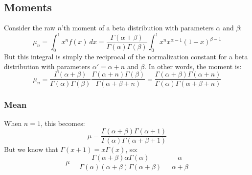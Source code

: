 \documentclass[12pt, a4paper]{article}
\begin{document}

\subsection{Moments}
Consider the raw $n$'th moment of a beta distribution with parameters $\alpha$ and $\beta$:
\begin{equation}
\mu_n=\int_0^1 x^n f(x)\ dx=\frac{\Gamma(\alpha+\beta)}{\Gamma(\alpha)\Gamma(\beta)}\int_0^1 x^n x^{\alpha-1}(1-x)^{\beta-1}
\end{equation}
But this integral is simply the reciprocal of the normalization constant for a beta distribution with parameters $\alpha'=\alpha+n$ and $\beta$. In other words, the moment is:
\begin{equation}
\mu_n=\frac{\Gamma(\alpha+\beta)}{\Gamma(\alpha)\Gamma(\beta)}\frac{\Gamma(\alpha+n)\Gamma(\beta)}{\Gamma(\alpha+\beta+n)}=\frac{\Gamma(\alpha+\beta)\Gamma(\alpha+n)}{\Gamma(\alpha)\Gamma(\alpha+\beta+n)}
\end{equation}

\subsubsection{Mean}
When $n=1$, this becomes:
\begin{equation}
\mu=\frac{\Gamma(\alpha+\beta)\Gamma(\alpha+1)}{\Gamma(\alpha)\Gamma(\alpha+\beta+1)}
\end{equation}
But we know that $\Gamma(x+1)=x\Gamma(x)$, so:
\begin{equation}
\mu=\frac{\Gamma(\alpha+\beta)\alpha\Gamma(\alpha)}{\Gamma(\alpha)(\alpha+\beta)\Gamma(\alpha+\beta)}=\frac{\alpha}{\alpha+\beta}
\end{equation}
\end{document}
